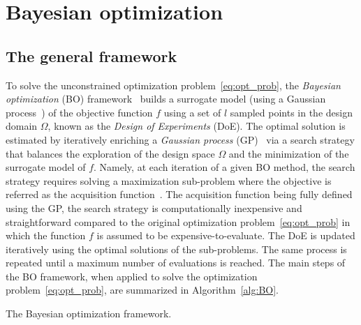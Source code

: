 \section{Bayesian optimization}
\label{sec:BO}

\subsection{The general framework}

To solve the unconstrained optimization problem~\eqref{eq:opt_prob}, the \textit{Bayesian optimization} (BO) framework~\cite{MockusBayesianmethodsseeking1975,JonesEfficientglobaloptimization1998} builds a surrogate model (using a Gaussian process~\cite{RasmussenGaussianprocessesmachine2006, Krigestatisticalapproachbasic1951}) of the objective function $f$ using a set of $l$ sampled points in the design domain $\Omega$, known as the \textit{Design of Experiments} (DoE).
The optimal solution is estimated by iteratively enriching a \textit{Gaussian process} (GP)~\cite{RasmussenGaussianprocessesmachine2006,Krigestatisticalapproachbasic1951} via a search strategy that balances the exploration of the design space $\Omega$ and the minimization of the surrogate model of $f$.
Namely, at each iteration of a given BO method, the search strategy requires solving a maximization sub-problem where the objective is referred as the acquisition function~\cite{frazierTutorialBayesianOptimization2018, ShahriariTakingHumanOut2016, WangMaxvalueentropysearch2017,bartoliAdaptiveModelingStrategy2019,tranAphBO2GP3BBudgetedAsynchronouslyparallel2020}.
The acquisition function being fully defined using the GP, the search strategy is computationally inexpensive and straightforward compared to the original optimization problem~\eqref{eq:opt_prob} in which the function $f$ is assumed to be expensive-to-evaluate.
The DoE is updated iteratively using the optimal solutions of the sub-problems.
The same process is repeated until a maximum number of evaluations is reached. %
The main steps of the BO framework, when applied to solve the optimization problem~\eqref{eq:opt_prob}, are summarized in Algorithm~\ref{alg:BO}.
\begin{algorithm}[ht!]
     \begin{algorithmic}[1]
        \ENDFOR
    \end{algorithmic}
    \caption{The Bayesian optimization framework.}
    \label{alg:BO}
\end{algorithm}

